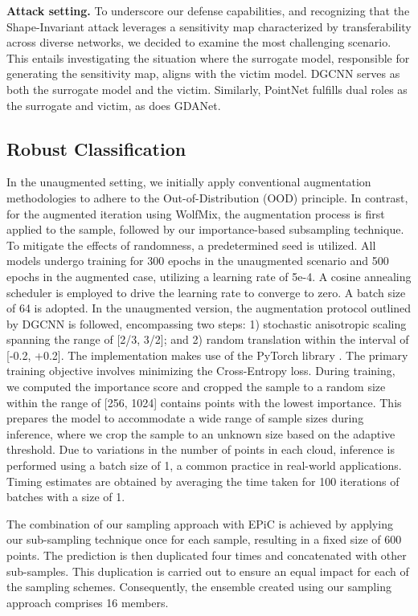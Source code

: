 \documentclass[10pt,twocolumn,letterpaper]{article}
\begin{document}
\textbf{Attack setting.} To underscore our defense capabilities, and recognizing that the Shape-Invariant attack leverages a sensitivity map characterized by transferability across diverse networks, we decided to examine the most challenging scenario. This entails investigating the situation where the surrogate model, responsible for generating the sensitivity map, aligns with the victim model. DGCNN\cite{dgcnn} serves as both the surrogate model and the victim. Similarly, PointNet\cite{pointnet} fulfills dual roles as the surrogate and victim, as does GDANet\cite{gdanet}.
\subsection{Robust Classification}
In the unaugmented setting, we initially apply conventional augmentation methodologies to adhere to the Out-of-Distribution (OOD) principle. In contrast, for the augmented iteration using WolfMix\cite{pointwolf, rsmix}, the augmentation process is first applied to the sample, followed by our importance-based subsampling technique. To mitigate the effects of randomness, a predetermined seed is utilized.
All models undergo training for 300 epochs in the unaugmented scenario and 500 epochs in the augmented case, utilizing a learning rate of 5e-4. A cosine annealing scheduler \cite{cosine_annealing} is employed to drive the learning rate to converge to zero. A batch size of 64 is adopted.
In the unaugmented version, the augmentation protocol outlined by DGCNN \cite{dgcnn} is followed, encompassing two steps: 1) stochastic anisotropic scaling spanning the range of [2/3, 3/2]; and 2) random translation within the interval of [-0.2, +0.2]. The implementation makes use of the PyTorch library \cite{pytorch}. The primary training objective involves minimizing the Cross-Entropy loss.
During training, we computed the importance score and cropped the sample to a random size within the range of [256, 1024] contains points with the lowest importance. This prepares the model to accommodate a wide range of sample sizes during inference, where we crop the sample to an unknown size based on the adaptive threshold. Due to variations in the number of points in each cloud, inference is performed using a batch size of 1, a common practice in real-world applications. Timing estimates are obtained by averaging the time taken for 100 iterations of batches with a size of 1.

The combination of our sampling approach with EPiC\cite{epic} is achieved by applying our sub-sampling technique once for each sample, resulting in a fixed size of 600 points. The prediction is then duplicated four times and concatenated with other sub-samples. This duplication is carried out to ensure an equal impact for each of the sampling schemes. Consequently, the ensemble created using our sampling approach comprises 16 members.
\end{document}
